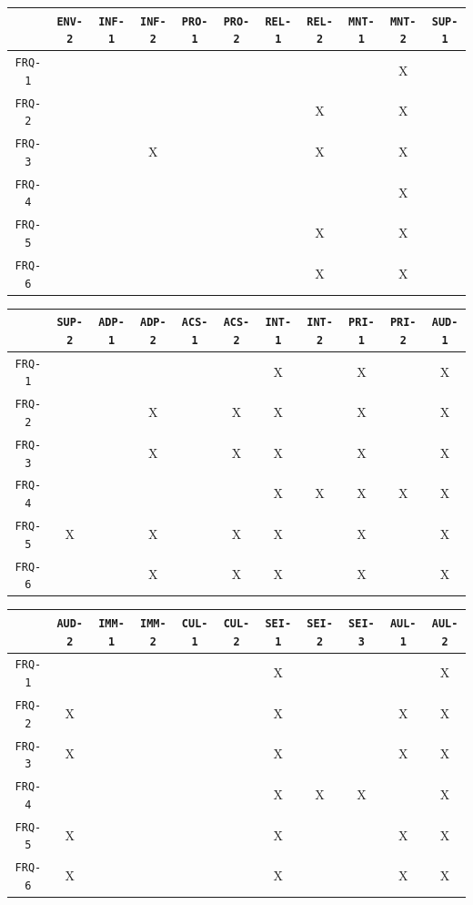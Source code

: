 \documentclass[12pt]{article}
\begin{document}
\begin{tabular}{|c|c|c|c|c|c|c|c|c|c|c|}
\hline
	& \texttt{ENV-2} & \texttt{INF-1} & \texttt{INF-2} & \texttt{PRO-1} & \texttt{PRO-2} & \texttt{REL-1} & \texttt{REL-2} & \texttt{MNT-1} & \texttt{MNT-2} & \texttt{SUP-1} \\
\hline
\texttt{FRQ-1} &  &  &  &  &  &  &  &  & X &  \\ \hline
\texttt{FRQ-2} &  &  &  &  &  &  & X &  & X &  \\ \hline
\texttt{FRQ-3} &  &  & X &  &  &  & X &  & X &  \\ \hline
\texttt{FRQ-4} &  &  &  &  &  &  &  &  & X &  \\ \hline
\texttt{FRQ-5} &  &  &  &  &  &  & X &  & X &  \\ \hline
\texttt{FRQ-6} &  &  &  &  &  &  & X &  & X &  \\ \hline
\end{tabular}

\begin{tabular}{|c|c|c|c|c|c|c|c|c|c|c|}
\hline
	& \texttt{SUP-2} & \texttt{ADP-1} & \texttt{ADP-2} & \texttt{ACS-1} & \texttt{ACS-2} & \texttt{INT-1} & \texttt{INT-2} & \texttt{PRI-1} & \texttt{PRI-2} & \texttt{AUD-1} \\
\hline
\texttt{FRQ-1} &  &  &  &  &  & X &  & X &  & X \\ \hline
\texttt{FRQ-2} &  &  & X &  & X & X &  & X &  & X \\ \hline
\texttt{FRQ-3} &  &  & X &  & X & X &  & X &  & X \\ \hline
\texttt{FRQ-4} &  &  &  &  &  & X & X & X & X & X \\ \hline
\texttt{FRQ-5} & X &  & X &  & X & X &  & X &  & X \\ \hline
\texttt{FRQ-6} &  &  & X &  & X & X &  & X &  & X \\ \hline
\end{tabular}

\begin{tabular}{|c|c|c|c|c|c|c|c|c|c|c|}
\hline
	& \texttt{AUD-2} & \texttt{IMM-1} & \texttt{IMM-2} & \texttt{CUL-1} & \texttt{CUL-2} & \texttt{SEI-1} & \texttt{SEI-2} & \texttt{SEI-3} & \texttt{AUL-1} & \texttt{AUL-2} \\
\hline
\texttt{FRQ-1} &  &  &  &  &  & X &  &  &  & X \\ \hline
\texttt{FRQ-2} & X &  &  &  &  & X &  &  & X & X \\ \hline
\texttt{FRQ-3} & X &  &  &  &  & X &  &  & X & X \\ \hline
\texttt{FRQ-4} &  &  &  &  &  & X & X & X &  & X \\ \hline
\texttt{FRQ-5} & X &  &  &  &  & X &  &  & X & X \\ \hline
\texttt{FRQ-6} & X &  &  &  &  & X &  &  & X & X \\ \hline
\end{tabular}
\end{document}
